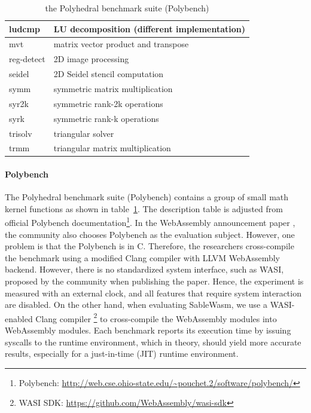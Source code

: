 \begin{table}
\begin{tabular}{|l|l|}
        ludcmp                  & LU decomposition (different implementation)         \\ \hline
        mvt                     & matrix vector product and transpose                 \\ \hline
        reg-detect              & 2D image processing                                 \\ \hline
        seidel                  & 2D Seidel stencil computation                       \\ \hline
        symm                    & symmetric matrix multiplication                     \\ \hline
        syr2k                   & symmetric rank-2k operations                        \\ \hline
        syrk                    & symmetric rank-k operations                         \\ \hline
        trisolv                 & triangular solver                                   \\ \hline
        trmm                    & triangular matrix multiplication                    \\ \hline
    \end{tabular}
    \caption{the Polyhedral benchmark suite (Polybench)}
    \label{tbl:polybench}
\end{table}

\paragraph{Polybench}
The Polyhedral benchmark suite (Polybench) \cite{polybench} contains a group of small math kernel functions as shown in table~\ref{tbl:polybench}. The description table is adjusted from official Polybench documentation\footnote{Polybench: \url{http://web.cse.ohio-state.edu/~pouchet.2/software/polybench/}}. In the WebAssembly announcement paper \cite{10.1145/3062341.3062363}, the community also chooses Polybench as the evaluation subject. However, one problem is that the Polybench is in C. Therefore, the researchers cross-compile the benchmark using a modified Clang compiler with LLVM WebAssembly backend. However, there is no standardized system interface, such as WASI, proposed by the community when publishing the paper. Hence, the experiment is measured with an external clock, and all features that require system interaction are disabled. On the other hand, when evaluating SableWasm, we use a WASI-enabled Clang compiler \footnote{WASI SDK: \url{https://github.com/WebAssembly/wasi-sdk}} to cross-compile the WebAssembly modules into WebAssembly modules. Each benchmark reports its execution time by issuing syscalls to the runtime environment, which in theory, should yield more accurate results, especially for a just-in-time (JIT) runtime environment.

